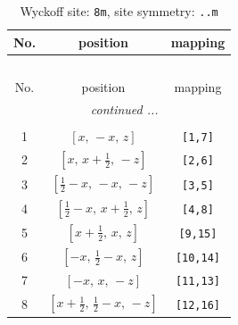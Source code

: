 \documentclass[fleqn,8pt]{jsarticle}
\begin{document}
\begin{longtable}{ccc}
\caption{Wyckoff site: {\tt 8m}, site symmetry: {\tt ..m}}
 \\
 \hline \hline
No. & position & mapping \\ \hline \endfirsthead

\multicolumn{2}{l}{\tablename\ \thetable{}} \\
 \hline \hline
No. & position & mapping \\ \hline \endhead

 \hline \hline
\multicolumn{2}{r}{\footnotesize\it continued ...} \\ \endfoot

 \hline \hline
\multicolumn{2}{r}{} \\ \endlastfoot

1 & $\left[ x,\, - x,\, z \right]$ & {\tt [1,7]} \\ \hline
2 & $\left[ x,\, x + \frac{1}{2},\, - z \right]$ & {\tt [2,6]} \\ \hline
3 & $\left[ \frac{1}{2} - x,\, - x,\, - z \right]$ & {\tt [3,5]} \\ \hline
4 & $\left[ \frac{1}{2} - x,\, x + \frac{1}{2},\, z \right]$ & {\tt [4,8]} \\ \hline
5 & $\left[ x + \frac{1}{2},\, x,\, z \right]$ & {\tt [9,15]} \\ \hline
6 & $\left[ - x,\, \frac{1}{2} - x,\, z \right]$ & {\tt [10,14]} \\ \hline
7 & $\left[ - x,\, x,\, - z \right]$ & {\tt [11,13]} \\ \hline
8 & $\left[ x + \frac{1}{2},\, \frac{1}{2} - x,\, - z \right]$ & {\tt [12,16]} \\
\end{longtable}
\renewcommand{\arraystretch}{1.2}
\end{document}
